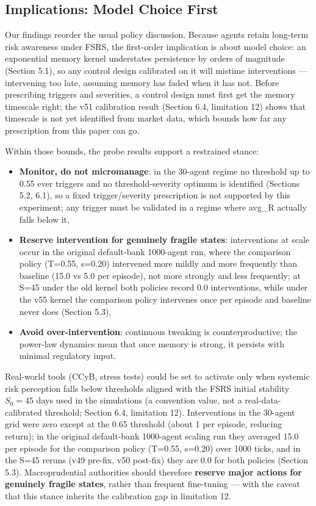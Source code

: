 \documentclass[11pt]{article}
\begin{document}
\subsection{Implications: Model Choice First}
Our findings reorder the usual policy discussion. Because agents retain long-term risk awareness under FSRS, the first-order implication is about model choice: an exponential memory kernel understates persistence by orders of magnitude (Section 5.1), so any control design calibrated on it will mistime interventions --- intervening too late, assuming memory has faded when it has not. Before prescribing triggers and severities, a control design must first get the memory timescale right; the v51 calibration result (Section 6.4, limitation 12) shows that timescale is not yet identified from market data, which bounds how far any prescription from this paper can go.

Within those bounds, the probe results support a restrained stance:

\begin{itemize}
\item \textbf{Monitor, do not micromanage}: in the 30-agent regime no threshold up to 0.55 ever triggers and no threshold-severity optimum is identified (Sections 5.2, 6.1), so a fixed trigger/severity prescription is not supported by this experiment; any trigger must be validated in a regime where avg\_R actually falls below it,
\item \textbf{Reserve intervention for genuinely fragile states}: interventions at scale occur in the original default-bank 1000-agent run, where the comparison policy (T=0.55, s=0.20) intervened more mildly and more frequently than baseline (15.0 vs 5.0 per episode), not more strongly and less frequently; at S=45 under the old kernel both policies record 0.0 interventions, while under the v55 kernel the comparison policy intervenes once per episode and baseline never does (Section 5.3),
\item \textbf{Avoid over-intervention}: continuous tweaking is counterproductive; the power-law dynamics mean that once memory is strong, it persists with minimal regulatory input.
\end{itemize}

Real-world tools (CCyB, stress tests) could be set to activate only when systemic risk perception falls below thresholds aligned with the FSRS initial stability $S_0 = 45$ days used in the simulations (a convention value, not a real-data-calibrated threshold; Section 6.4, limitation 12). Interventions in the 30-agent grid were zero except at the 0.65 threshold (about 1 per episode, reducing return); in the original default-bank 1000-agent scaling run they averaged 15.0 per episode for the comparison policy (T=0.55, s=0.20) over 1000 ticks, and in the S=45 reruns (v49 pre-fix, v50 post-fix) they are 0.0 for both policies (Section 5.3). Macroprudential authorities should therefore \textbf{reserve major actions for genuinely fragile states}, rather than frequent fine-tuning --- with the caveat that this stance inherits the calibration gap in limitation 12.
\end{document}
